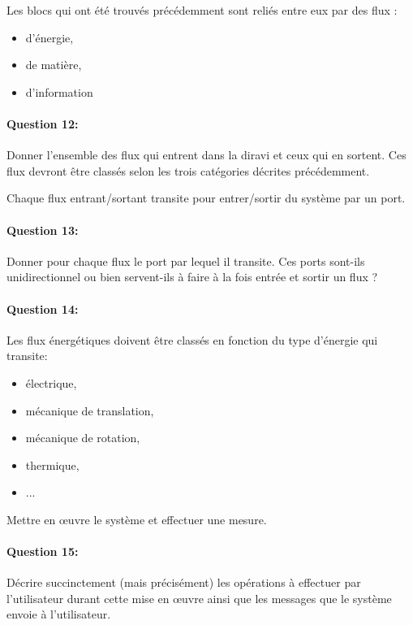 
Les blocs qui ont été trouvés précédemment sont reliés entre eux par des flux :
\begin{itemize}
 \item d'énergie,
 \item de matière,
 \item d'information
\end{itemize}

\paragraph{Question 12:} Donner l'ensemble des flux qui entrent dans la diravi et ceux qui en sortent. Ces flux devront être classés selon les trois catégories décrites précédemment.

Chaque flux entrant/sortant transite pour entrer/sortir du système par un port.

\paragraph{Question 13:} Donner pour chaque flux le port par lequel il transite. Ces ports sont-ils unidirectionnel ou bien servent-ils à faire à la fois entrée et sortir un flux ?

\paragraph{Question 14:} Les flux énergétiques doivent être classés en fonction du type d'énergie qui transite:
\begin{itemize}
 \item électrique,
 \item mécanique de translation,
 \item mécanique de rotation,
 \item thermique,
 \item ...
\end{itemize}


Mettre en \oe uvre le système et effectuer une mesure.

\paragraph{Question 15:} Décrire succinctement (mais précisément) les opérations à effectuer par l'utilisateur durant cette mise en \oe uvre ainsi que les messages que le système envoie à l'utilisateur.


